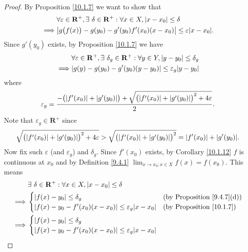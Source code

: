 \begin{proof}
    By Proposition \ref{10.1.7} we want to show that
    \begin{align*}
                 & \forall \varepsilon \in \mathbf{R}^+, \exists\ \delta \in \mathbf{R}^+ : \forall x \in X, \abs*{x - x_0} \leq \delta \\
        \implies & \abs*{g\big(f(x)\big) - g(y_0) - g'(y_0) f'(x_0) (x - x_0)} \leq \varepsilon \abs*{x - x_0}.
    \end{align*}
    Since \(g'(y_0)\) exists, by Proposition \ref{10.1.7} we have
    \begin{align*}
                 & \forall \varepsilon \in \mathbf{R}^+, \exists\ \delta_g \in \mathbf{R}^+ : \forall y \in Y, \abs*{y - y_0} \leq \delta_g \\
        \implies & \abs*{g(y) - g(y_0) - g'(y_0) (y - y_0)} \leq \varepsilon_g \abs*{y - y_0}
    \end{align*}
    where
    \[
        \varepsilon_g = \frac{-\big(\abs*{f'(x_0)} + \abs*{g'(y_0)}\big) + \sqrt{\big(\abs*{f'(x_0)} + \abs*{g'(y_0)}\big)^2 + 4 \varepsilon}}{2}.
    \]
    Note that \(\varepsilon_g \in \mathbf{R}^+\) since
    \[
        \sqrt{\big(\abs*{f'(x_0)} + \abs*{g'(y_0)}\big)^2 + 4 \varepsilon} > \sqrt{\big(\abs*{f'(x_0)} + \abs*{g'(y_0)}\big)^2} = \abs*{f'(x_0)} + \abs*{g'(y_0)}.
    \]
    Now fix such \(\varepsilon\) (and \(\varepsilon_g\)) and \(\delta_g\).
    Since \(f'(x_0)\) exists, by Corollary \ref{10.1.12} \(f\) is continuous at \(x_0\) and by Definition \ref{9.4.1} \(\lim_{x \to x_0 ; x \in X} f(x) = f(x_0)\).
    This means
    \begin{align*}
                 & \exists\ \delta \in \mathbf{R}^+ : \forall x \in X, \abs*{x - x_0} \leq \delta                                              \\
        \implies & \begin{cases}
                       \abs*{f(x) - y_0} \leq \delta_g                                         & \text{(by Proposition \ref{9.4.7}(d))} \\
                       \abs*{f(x) - y_0 - f'(x_0) (x - x_0)} \leq \varepsilon_g \abs*{x - x_0} & \text{(by Proposition \ref{10.1.7})}
                   \end{cases} \\
        \implies & \begin{cases}
                       \abs*{f(x) - y_0} \leq \delta_g                                         \\
                       \abs*{f(x) - y_0 - f'(x_0) (x - x_0)} \leq \varepsilon_g \abs*{x - x_0} \\

\end{cases}
\end{align*}
\end{proof}
